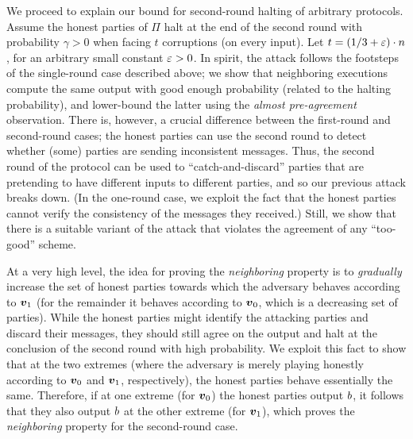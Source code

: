 We proceed to explain our bound for second-round halting of arbitrary protocols. Assume the honest parties of $\Pi$ halt at the end of the second round with probability $\gamma>0$ when facing $t$ corruptions (on every input). Let $t=(1/3+\varepsilon)\cdot n$, for an arbitrary small constant $\varepsilon>0$. In spirit, the attack follows the footsteps of the single-round case described above; we show that neighboring executions compute the same output with good enough probability (related to the halting probability), and lower-bound the latter using the \emph{almost pre-agreement}
observation. There is, however, a crucial difference between the first-round and second-round cases; the honest parties can use the second round to detect whether (some) parties are sending inconsistent messages. Thus, the second round of the protocol can be used to ``catch-and-discard'' parties that are pretending to have different inputs to different parties, and so our previous attack breaks down. (In the one-round case, we exploit the fact that the honest parties cannot verify the consistency of the messages they received.) Still, we show that there is a suitable variant of the attack that violates the agreement of any ``too-good'' scheme.

At a very high level, the idea for proving the \emph{neighboring} property is to \emph{gradually} increase the set of honest parties towards which the adversary behaves according to ${ \boldsymbol{v}}_1$ (for the remainder it behaves according to ${ \boldsymbol{v}}_0$, which is a decreasing set of parties). While the honest parties might identify the attacking parties and discard their messages, they should still agree on the output and halt at the conclusion of the second round with high probability. We exploit this fact to show that at the two extremes (where the adversary is merely playing honestly according to ${ \boldsymbol{v}}_0$ and ${ \boldsymbol{v}}_1$, respectively), the honest parties behave essentially the same. Therefore, if at one extreme (for ${ \boldsymbol{v}}_0$) the honest parties output $b$, it follows that they also output $b$ at the other extreme (for ${ \boldsymbol{v}}_1$), which proves the \emph{neighboring} property for the second-round case.



